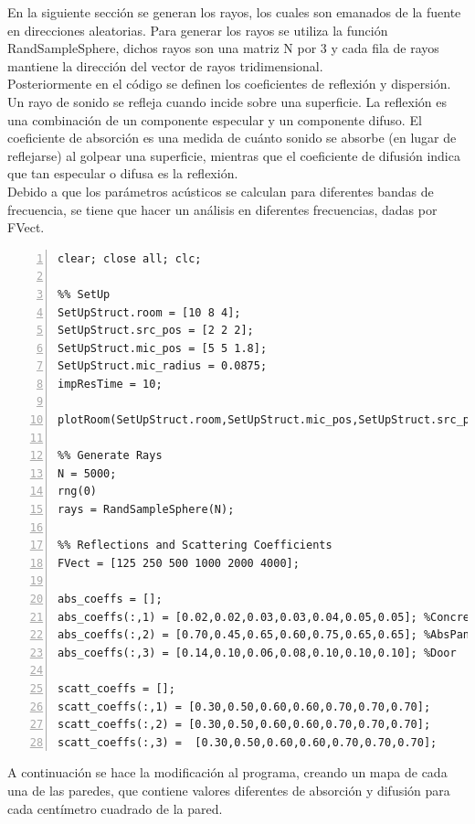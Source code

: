 \FloatBarrier
En la siguiente sección se generan los rayos, los cuales son emanados de la fuente en direcciones aleatorias. Para generar los rayos se utiliza la función RandSampleSphere, dichos rayos son una matriz N por 3 y cada fila de rayos mantiene la dirección del vector de rayos tridimensional.\\
Posteriormente en el código se definen los coeficientes de reflexión y dispersión. Un rayo de sonido se refleja cuando incide sobre una superficie. La reflexión es una combinación de un componente especular y un componente difuso. El coeficiente de absorción es una medida de cuánto sonido se absorbe (en lugar de reflejarse) al golpear una superficie, mientras que el coeficiente de difusión indica que tan especular o difusa es la reflexión.\\
Debido a que los parámetros acústicos se calculan para diferentes bandas de frecuencia, se tiene que hacer un análisis en diferentes frecuencias, dadas por FVect.
\begin{lstlisting}[frame=single,numbers=left, style=Matlab-editor, basicstyle=\tiny]
clear; close all; clc;

%% SetUp
SetUpStruct.room = [10 8 4];
SetUpStruct.src_pos = [2 2 2];
SetUpStruct.mic_pos = [5 5 1.8];
SetUpStruct.mic_radius = 0.0875;
impResTime = 10;

plotRoom(SetUpStruct.room,SetUpStruct.mic_pos,SetUpStruct.src_pos,1)

%% Generate Rays
N = 5000;
rng(0)
rays = RandSampleSphere(N);

%% Reflections and Scattering Coefficients
FVect = [125 250 500 1000 2000 4000];

abs_coeffs = [];
abs_coeffs(:,1) = [0.02,0.02,0.03,0.03,0.04,0.05,0.05]; %Concrete
abs_coeffs(:,2) = [0.70,0.45,0.65,0.60,0.75,0.65,0.65]; %AbsPanels
abs_coeffs(:,3) = [0.14,0.10,0.06,0.08,0.10,0.10,0.10]; %Door

scatt_coeffs = [];
scatt_coeffs(:,1) = [0.30,0.50,0.60,0.60,0.70,0.70,0.70];
scatt_coeffs(:,2) = [0.30,0.50,0.60,0.60,0.70,0.70,0.70];
scatt_coeffs(:,3) =  [0.30,0.50,0.60,0.60,0.70,0.70,0.70];
\end{lstlisting}
A continuación se hace la modificación al programa, creando un mapa de cada una de las paredes, que contiene valores diferentes de absorción y difusión para cada centímetro cuadrado de la pared. 
